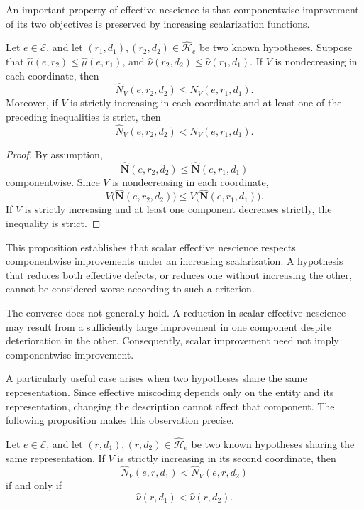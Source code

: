An important property of effective nescience is that componentwise improvement of its two objectives is preserved by increasing scalarization functions.

\begin{proposition}
Let $e\in\mathcal E$, and let $(r_1,d_1),(r_2,d_2)\in\widehat{\mathcal H}_e$ be two known hypotheses. Suppose that $\widehat\mu(e,r_2)\leq\widehat\mu(e,r_1)$, and $\widehat\nu(r_2,d_2)\leq\widehat\nu(r_1,d_1)$. If $V$ is nondecreasing in each coordinate, then
\[
\widehat N_V(e,r_2,d_2) \leq \widehat N_V(e,r_1,d_1).
\]
Moreover, if $V$ is strictly increasing in each coordinate and at least one of the preceding inequalities is strict, then
\[
\widehat N_V(e,r_2,d_2) < \widehat N_V(e,r_1,d_1).
\]
\end{proposition}
\begin{proof}
By assumption,
\[
\widehat{\mathbf N}(e,r_2,d_2) \leq \widehat{\mathbf N}(e,r_1,d_1)
\]
componentwise. Since $V$ is nondecreasing in each coordinate,
\[
V\bigl(\widehat{\mathbf N}(e,r_2,d_2)\bigr) \leq V\bigl(\widehat{\mathbf N}(e,r_1,d_1)\bigr).
\]
If $V$ is strictly increasing and at least one component decreases strictly, the inequality is strict.
\end{proof}

This proposition establishes that scalar effective nescience respects componentwise improvements under an increasing scalarization. A hypothesis that reduces both effective defects, or reduces one without increasing the other, cannot be considered worse according to such a criterion.

The converse does not generally hold. A reduction in scalar effective nescience may result from a sufficiently large improvement in one component despite deterioration in the other. Consequently, scalar improvement need not imply componentwise improvement.

A particularly useful case arises when two hypotheses share the same representation. Since effective miscoding depends only on the entity and its representation, changing the description cannot affect that component. The following proposition makes this observation precise.

\begin{proposition}
Let $e\in\mathcal E$, and let $(r,d_1),(r,d_2)\in\widehat{\mathcal H}_e$ be two known hypotheses sharing the same representation. If $V$ is strictly increasing in its second coordinate, then
\[
\widehat N_V(e,r,d_1) < \widehat N_V(e,r,d_2)
\]
if and only if
\[
\widehat\nu(r,d_1) < \widehat\nu(r,d_2).
\]
\end{proposition}

